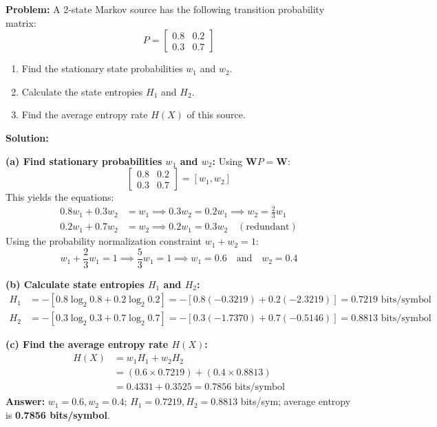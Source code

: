 \documentclass[12pt,a4paper]{article}
\begin{document}
\begin{tcolorbox}[examplebox, title={Worked Example: Entropy Rate of a Markov Source}]
\textbf{Problem:} A 2-state Markov source has the following transition probability matrix:
\begin{equation*}
  P = \begin{bmatrix}
    0.8 & 0.2 \\
    0.3 & 0.7
  \end{bmatrix}
\end{equation*}
\begin{enumerate}[label=\alph*., leftmargin=*, itemsep=1pt, topsep=1pt]
  \item Find the stationary state probabilities $w_1$ and $w_2$.
  \item Calculate the state entropies $H_1$ and $H_2$.
  \item Find the average entropy rate $H(X)$ of this source.
\end{enumerate}
\textbf{Solution:}

\textbf{(a) Find stationary probabilities $w_1$ and $w_2$:}
Using $\mathbf{W}P = \mathbf{W}$:
\begin{equation*}
  [w_1, w_2] \begin{bmatrix} 0.8 & 0.2 \\ 0.3 & 0.7 \end{bmatrix} = [w_1, w_2]
\end{equation*}
This yields the equations:
\begin{align*}
  0.8w_1 + 0.3w_2 &= w_1 \implies 0.3w_2 = 0.2w_1 \implies w_2 = \frac{2}{3}w_1 \\
  0.2w_1 + 0.7w_2 &= w_2 \implies 0.2w_1 = 0.3w_2 \quad (\text{redundant})
\end{align*}
Using the probability normalization constraint $w_1 + w_2 = 1$:
\begin{equation*}
  w_1 + \frac{2}{3}w_1 = 1 \implies \frac{5}{3}w_1 = 1 \implies w_1 = 0.6 \quad \text{and} \quad w_2 = 0.4
\end{equation*}

\textbf{(b) Calculate state entropies $H_1$ and $H_2$:}
\begin{align*}
  H_1 &= -[0.8\log_2 0.8 + 0.2\log_2 0.2] = -[0.8(-0.3219) + 0.2(-2.3219)] = 0.7219 \text{ bits/symbol} \\
  H_2 &= -[0.3\log_2 0.3 + 0.7\log_2 0.7] = -[0.3(-1.7370) + 0.7(-0.5146)] = 0.8813 \text{ bits/symbol}
\end{align*}

\textbf{(c) Find the average entropy rate $H(X)$:}
\begin{align*}
  H(X) &= w_1 H_1 + w_2 H_2 \\
  &= (0.6 \times 0.7219) + (0.4 \times 0.8813) \\
  &= 0.4331 + 0.3525 = 0.7856 \text{ bits/symbol}
\end{align*}
\textbf{Answer:} $w_1=0.6, w_2=0.4$; $H_1=0.7219, H_2=0.8813$ bits/sym; average entropy is \textbf{0.7856 bits/symbol}.
\end{tcolorbox}
\end{document}
